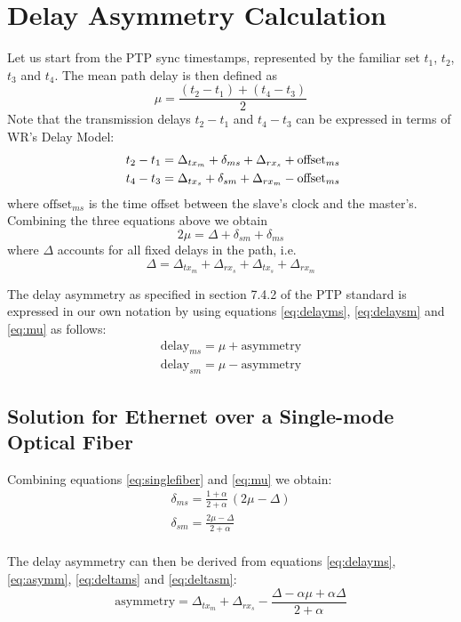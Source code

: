 \documentclass[a4paper, 12pt]{article}
\newcommand{\eqoffset}[1]{%
  {\ensuremath{%
      {\text{offset}}_{#1}}%
  }%
}
\newcommand{\eqdelay}[1]{{\text{delay}}_{#1}}
\newcommand{\eqasymm}{{\text{asymmetry}}}
\begin{document}
\section{Delay Asymmetry Calculation}
\label{sec:delayAsymCal}

Let us start from the PTP sync timestamps, represented by the familiar
set $t_1$, $t_2$, $t_3$ and $t_4$. The mean path delay is then defined as
\begin{equation}
\label{eq:meanPath}
  \mu = \frac{(t_2 - t_1) + (t_4 - t_3)}{2}
\end{equation}
Note that the transmission delays $t_2 - t_1$ and $t_4 - t_3$ can be
expressed in terms of WR's Delay Model:
\begin{align}
\
  t_2 - t_1 = \Delta_{tx_m} + \delta_{ms} + \Delta_{rx_s} + \eqoffset{ms}\\
  t_4 - t_3 = \Delta_{tx_s} + \delta_{sm} + \Delta_{rx_m} - \eqoffset{ms}
\end{align} where \eqoffset{ms} is the time offset between the
slave's clock and the master's. Combining the three equations above
we obtain
\begin{equation}
\label{eq:mu}
  2\mu = \Delta + \delta_{sm} + \delta_{ms}
\end{equation} where $\Delta$ accounts for all fixed delays in the path,
i.e.
\begin{equation}
\label{eq:delta}
  \Delta = \Delta_{tx_m} + \Delta_{rx_s} + \Delta_{tx_s} + \Delta_{rx_m}
\end{equation}

The delay asymmetry as specified in section 7.4.2 of the PTP standard is expressed in our own 
notation by using equations \eqref{eq:delayms},
\eqref{eq:delaysm} and \eqref{eq:mu} as follows:
\begin{align}
  \eqdelay{ms} = \mu + \eqasymm
  \label{eq:asymm} \\
  \eqdelay{sm} = \mu - \eqasymm
\end{align}


\subsection{Solution for Ethernet over a Single-mode Optical Fiber}
\label{sec:EthernetOverSingleModeFiber}
Combining equations \eqref{eq:singlefiber} and \eqref{eq:mu} we obtain:
\begin{gather}
  \delta_{ms} = \frac{1 + \alpha}{2 + \alpha} \, (2\mu - \Delta)
  \label{eq:deltams} \\
  \delta_{sm} = \frac{2\mu - \Delta}{2 + \alpha}
  \label{eq:deltasm}
\end{gather}
\\
The delay asymmetry can then be derived from equations \eqref{eq:delayms}, \eqref{eq:asymm}, 
\eqref{eq:deltams} and
\eqref{eq:deltasm}:
\begin{equation}
\label{eq:aqasymm}
  \eqasymm = \Delta_{tx_m} + \Delta_{rx_s} - \frac{\Delta - \alpha \mu + \alpha \Delta}{2 + \alpha}
\end{equation}
\\
\end{document}
